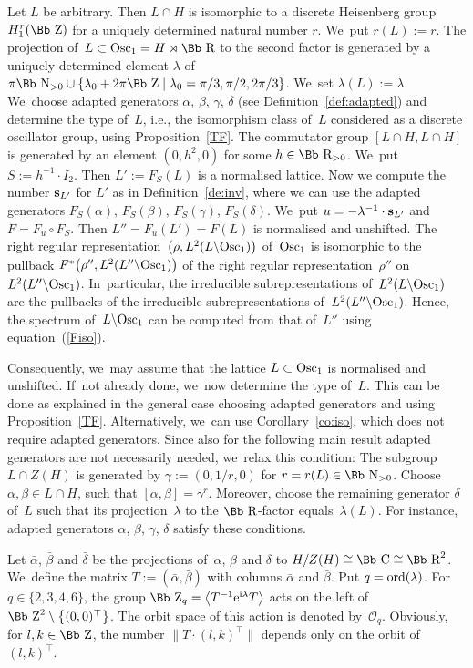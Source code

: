 \documentclass[pdftex]{sigma}
\newcommand\CC{{\mbox{\Bb C}}}
\newcommand\RR{{\mbox{\Bb R}}}
\newcommand\NN{{\mbox{\Bb N}}}
\newcommand\ZZ{{\mbox{\Bb Z}}}
\newcommand\bs{\textbf{{\rm \textbf{s}}}}
\newcommand{\Osc}{{\rm Osc}}
\newcommand{\ord}{{\rm ord}}
\newcommand\la{\langle}
\newcommand\ra{\rangle}
\numberwithin{equation}{section}
\begin{document}
Let $L$ be arbitrary. Then $L\cap H$ is isomorphic to a discrete Heisenberg group $H^r_1(\ZZ)$ for a uniquely determined natural number $r$. We~put $r(L):=r$. The projection of~$L\subset\Osc_1=H\rtimes\RR$ to the second factor is generated by a uniquely determined element $\lambda$ of~$\pi\NN_{>0}\cup \{\lambda_0+2\pi\ZZ\mid \lambda_0=\pi/3,\pi/2,2\pi/3\}$. We~set $\lambda(L):=\lambda$. We~choose adapted generators $\alpha$, $\beta$, $\gamma$, $\delta$ (see Definition~\ref{def:adapted}) and determine the type of~$L$, i.e., the isomorphism class of~$L$ considered as a discrete oscillator group, using Proposition~\ref{TF}.
The commutator group $[L\cap H, L\cap H]$ is generated by an element $(0,h^2,0)$ for some $h\in\RR_{>0}$. We~put $S:=h^{-1}\cdot I_2$. Then $L':=F_S(L)$ is a normalised lattice. Now we compute the number $\bs_{L'}$ for $L'$ as in Definition~\ref{de:inv}, where we can use the adapted generators $F_S(\alpha)$, $F_S(\beta)$, $F_S(\gamma)$, $F_S(\delta)$. We~put $u=-\lambda^{-1}\cdot\bs_{L'}$ and $F=F_u\circ F_S$.
Then $L''=F_u(L')=F(L)$ is normalised and unshifted.
The right regular representation~$\big(\rho,L^2(L\backslash\Osc_1)\big)$ of~$\Osc_1$ is isomorphic to the pullback $F^*\big(\rho'',L^2(L''\backslash\Osc_1)\big)$ of the right regular representation~$\rho''$ on~$L^2(L''\backslash\Osc_1)$. In~particular, the irreducible subrepresentations of~$L^2(L\backslash\Osc_1)$ are the pullbacks of the irreducible subrepresentations of~$L^2(L''\backslash\Osc_1)$. Hence, the spectrum of~$L\backslash \Osc_1$ can be computed from that of~$L''$ using equation~(\ref{Fiso}).

Consequently, we~may assume that the lattice $L\subset\Osc_1$ is normalised and unshifted. If~not already done, we~now determine the type of~$L$. This can be done as explained in the general case choosing adapted generators and using Proposition~\ref{TF}. Alternatively, we~can use Corollary~\ref{co:iso}, which does not require adapted generators.
Since also for the following main result adapted generators are not necessarily needed, we~relax this condition: The subgroup $L\cap Z(H)$ is generated by $\gamma:=(0,1/r,0)$ for $r=r(L)\in\NN_{>0}$. Choose $\alpha,\beta\in L\cap H$, such that $[\alpha,\beta]=\gamma^r$. Moreover, choose the remaining generator $\delta$ of~$L$ such that its projection~$\lambda$ to the $\RR$-factor equals~$\lambda(L)$.
For instance, adapted generators $\alpha$, $\beta$, $\gamma$, $\delta$ satisfy these conditions.

Let $\bar \alpha$, $\bar\beta$ and $\bar\delta$ be the projections of~$\alpha$, $\beta$ and $\delta$ to $H/Z(H)\cong \CC\cong\RR^2$. We~define the matrix $T:=(\bar\alpha,\bar\beta)$ with columns $\bar \alpha$ and $\bar \beta$.
Put $q=\ord(\lambda)$.
For $q\in\{2,3,4,6\}$, the group $\ZZ_q=\big\la T^{-1} {\rm e}^{{\rm i}\lambda} T\big\ra$ acts on the left of~$\ZZ^2\setminus \big\{(0,0)^\top\big\}$. The orbit space of this action is denoted by~${\mathcal O}_q$.
Obviously, for $l,k\in\ZZ$, the number $\big\|T\cdot (l,k)^\top\big\|$ depends only on the orbit of~$(l,k)^\top$.
\end{document}
